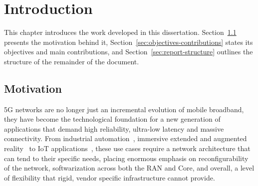 %

\chapter{Introduction}
\label{cha:introduction}

This chapter introduces the work developed in this dissertation. Section~\ref{sec:motivation} presents the motivation behind it, Section~\ref{sec:objectives-contributions} states its objectives and main contributions, and Section~\ref{sec:report-structure} outlines the structure of the remainder of the document.

\section{Motivation}
\label{sec:motivation}

5G networks are no longer just an incremental evolution of mobile broadband, they have become the technological foundation for a new generation of applications that demand high reliability, ultra-low latency and massive connectivity. From industrial automation~\cite{Khujamatov2021, brown2018ultrareliable, 13-electronics11030412}, immersive extended and augmented reality~\cite{16-TorresVega2020, LV2020158, 9363323} to \gls{IoT} applications~\cite{7835795, 8519960}, these use cases require a network architecture that can tend to their specific needs, placing enormous emphasis on reconfigurability of the network, softwarization across both the \gls{RAN} and Core, and overall, a level of flexibility that rigid, vendor specific infrastructure cannot provide.

